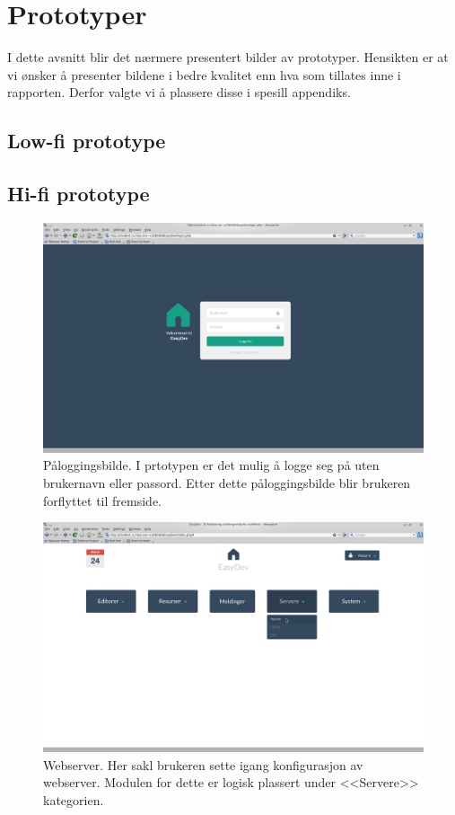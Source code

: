 \chapter{Prototyper}
I dette avsnitt blir det nærmere presentert bilder av prototyper. Hensikten er at vi ønsker å presenter bildene i bedre kvalitet enn hva som tillates inne i rapporten. Derfor valgte vi å plassere disse i spesill appendiks.
\section{Low-fi prototype}

\newpage
\section{Hi-fi prototype}
\begin{figure}[]
\includegraphics[width=\textwidth,height=\textheight,keepaspectratio]{./img/prosessdokumentasjon/hifi/login.png}
\caption[Hi-fi Påloggingsbilde]{Påloggingsbilde. I prtotypen er det mulig å logge seg på uten brukernavn eller passord. Etter dette påloggingsbilde blir brukeren forflyttet til fremside.}
\label{fig:loginhi}
\end{figure}

\begin{figure}[]
\includegraphics[width=\textwidth,height=\textheight,keepaspectratio]{./img/prosessdokumentasjon/hifi/a1.png}
\caption[Hi-fi Webserver 1]{Webserver. Her sakl brukeren sette igang konfigurasjon av webserver. Modulen for dette er logisk plassert under <<Servere>> kategorien.}
\label{fig:apachehi1}
\end{figure}

